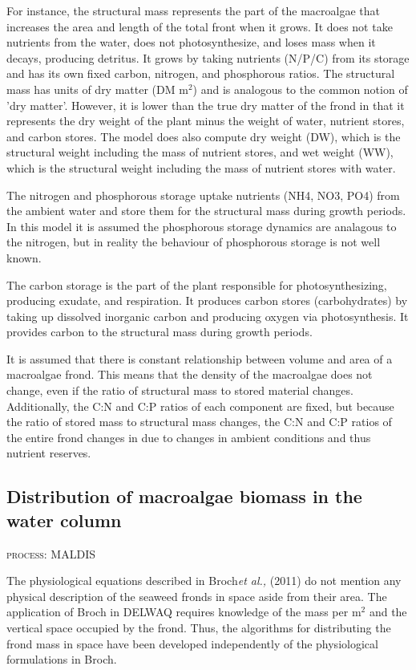 \documentclass{deltares_manual}
\begin{document}
For instance, the structural mass represents the part of the macroalgae that increases the area and length of the total front when it grows. It does not take nutrients from the water, does not photosynthesize, and loses mass when it decays, producing detritus. It grows by taking nutrients (N/P/C) from its storage and has its own fixed carbon, nitrogen, and phosphorous ratios. The structural mass has units of dry matter (DM m$^{2}$) and is analogous to the common notion of 'dry matter'. However, it is lower than the true dry matter of the frond in that it represents the dry weight of the plant minus the weight of water, nutrient stores, and carbon stores. The model does also compute dry weight (DW), which is the structural weight including the mass of nutrient stores, and wet weight (WW), which is the structural weight including the mass of nutrient stores with water.
 
The nitrogen and phosphorous storage uptake nutrients (NH4, NO3, PO4) from the ambient water and store them for the structural mass during growth periods. In this model it is assumed the phosphorous storage dynamics are analagous to the nitrogen, but in reality the behaviour of phosphorous storage is not well known.

The carbon storage is the part of the plant responsible for photosynthesizing, producing exudate, and respiration. It produces carbon stores (carbohydrates) by taking up dissolved inorganic carbon and producing oxygen via photosynthesis. It provides carbon to the structural mass during growth periods. 

It is assumed that there is constant relationship between volume and area of a macroalgae frond. This means that the density of the macroalgae does not change, even if the ratio of structural mass to stored material changes. Additionally, the C:N and C:P ratios of each component are fixed, but because the ratio of stored mass to structural mass changes, the C:N and C:P ratios of the entire frond changes in due to changes in ambient conditions and thus nutrient reserves.

\subsection{Distribution of macroalgae biomass in the water column}
\begin{flushright}
	\textsc{process: MALDIS}
\end{flushright}
The physiological equations described in Broch\textit{et al.,} (2011) do not mention any physical description of the seaweed fronds in space aside from their area. The application of Broch in DELWAQ requires knowledge of the mass per m$^{2}$ and the vertical space occupied by the frond. Thus, the algorithms for distributing the frond mass in space have been developed independently of the physiological formulations in Broch. 
\end{document}

